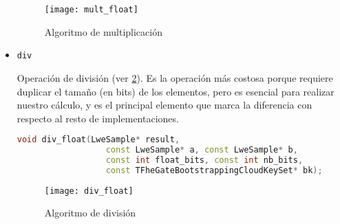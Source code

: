 \begin{itemize}
  \begin{figure}[h]
    \caption{Algoritmo de multiplicación}
    \label{fig:mult_float}
    \texttt{[image: mult\_float]}
  \end{figure}



  \item \texttt{div}

  Operación de división (ver \ref{fig:div_float}). Es la operación más costosa porque requiere duplicar el tamaño (en bits) de los elementos, pero es esencial para realizar nuestro cálculo, y es el principal elemento que marca la diferencia con respecto al resto de implementaciones.

  \begin{lstlisting}[language=c++]
  void div_float(LweSample* result,
                  const LweSample* a, const LweSample* b,
                  const int float_bits, const int nb_bits,
                  const TFheGateBootstrappingCloudKeySet* bk);
  \end{lstlisting}

  \begin{figure}[h]
    \caption{Algoritmo de división}
    \label{fig:div_float}
    \texttt{[image: div\_float]}
  \end{figure}


\end{itemize}

